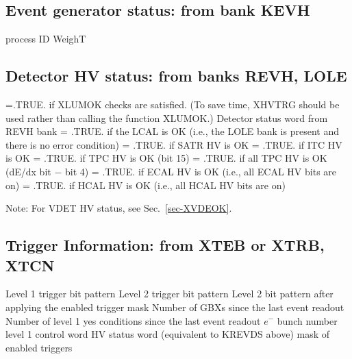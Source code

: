 \subsection{\label{sec-MHK}Event generator status: from bank KEVH}
\par
\begin{indentlist}{ 2.50cm}{ 2.75cm}
process ID
WeighT
\end{indentlist}
\subsection{\label{sec-MHR}Detector HV status: from banks REVH, LOLE}
\par
\begin{indentlist}{ 2.50cm}{ 2.75cm}
=.TRUE. if XLUMOK checks are satisfied. (To
save time,
XHVTRG should be used rather than calling the function XLUMOK.)
Detector status word from REVH bank
= .TRUE. if the LCAL is OK (i.e., the LOLE bank
is present and
there is no error condition)
= .TRUE. if SATR HV is OK
= .TRUE. if ITC HV is OK
= .TRUE. if TPC HV is OK  (bit 15)
= .TRUE. if all TPC HV is OK (dE/dx bit $-$
bit 4)
= .TRUE. if ECAL HV is OK (i.e., all ECAL HV
bits are on)
= .TRUE. if HCAL HV is OK (i.e., all HCAL HV
bits are on)
\end{indentlist}
\noindent Note: For VDET HV status, see Sec.~\ref{sec-XVDEOK}.
\par
\subsection{\label{sec-TRIG}Trigger Information: from XTEB or XTRB,
XTCN}
\par
\begin{indentlist}{ 2.50cm}{ 2.75cm}
Level 1 trigger bit pattern
Level 2 trigger bit pattern
Level 2 bit pattern after applying the enabled
trigger mask
Number of GBXs since the last event readout
Number of level 1 yes conditions since the last
event readout
$e^-$ bunch number
level 1 control word
HV status word (equivalent to KREVDS above)
mask of enabled triggers
\end{indentlist}
\par
